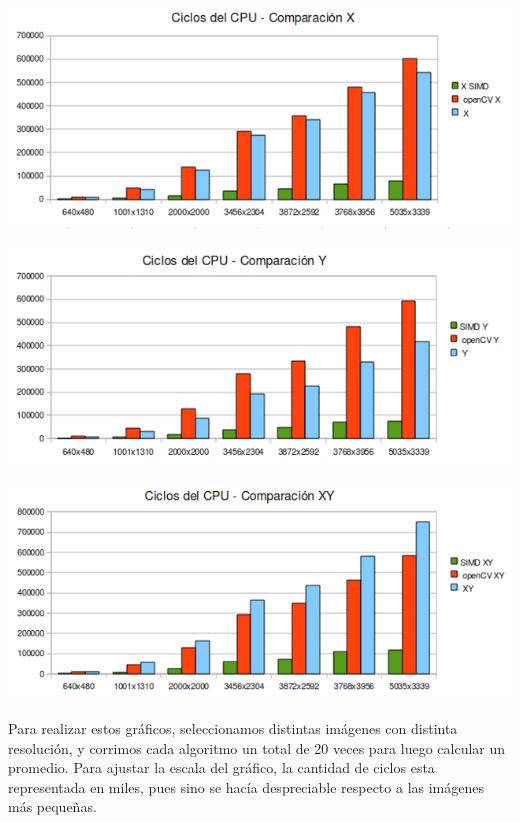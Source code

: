 \documentclass[a4paper, 10pt]{article}
\begin{document}
\begin{center}
	\includegraphics[scale=0.60]{Graficos/comp_X.png}
\end{center}

\begin{center}
	\includegraphics[scale=0.60]{Graficos/comp_Y.png}
\end{center}

\begin{center}
	\includegraphics[scale=0.60]{Graficos/comp_XY.png}
\end{center}

Para realizar estos gr\'aficos, seleccionamos distintas im\'agenes con distinta resoluci\'on, y corrimos cada algoritmo un total de 20 veces para luego calcular un promedio.
Para ajustar la escala del gr\'afico, la cantidad de ciclos esta representada en miles, pues sino se hac\'ia despreciable respecto a las im\'agenes m\'as peque\~nas. \\ 
\end{document}
